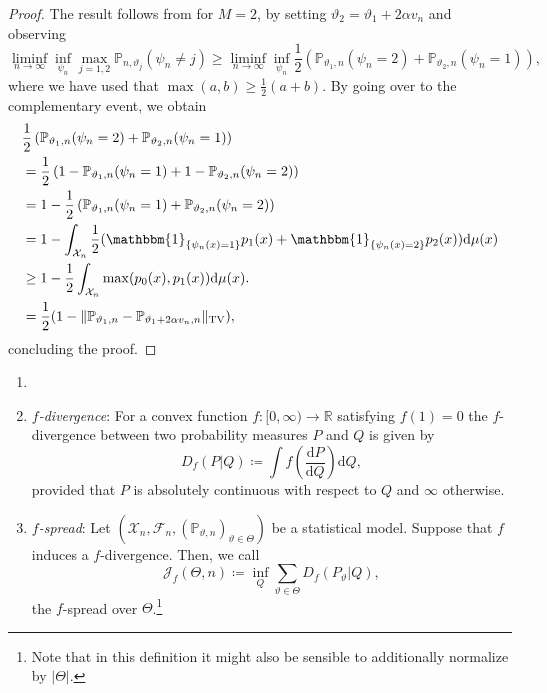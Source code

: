 \documentclass[a4paper]{article}
\begin{document}
\begin{proof}
The result follows from  for $M=2$, by setting $\vartheta_2=\vartheta_1 + 2 \alpha v_n$ and observing
\begin{equation*}
\liminf_{n\rightarrow \infty} \inf_{\psi_n} \max_{j=1,2}\mathbb{P}_{n,\vartheta_j}(\psi_n \neq j) \geq \liminf_{n\rightarrow \infty} \inf_{\psi_n} \frac{1}{2}\left(\mathbb{P}_{\vartheta_1,n}(\psi_n = 2) + \mathbb{P}_{\vartheta_2, n}(\psi_n = 1)\right),
\end{equation*}
where we have used that $\max(a,b) \geq \frac{1}{2}(a+b)$. By going over to the complementary event, we obtain
\begin{equation*}
\begin{aligned}
&\frac{1}{2}\left(\mathbb{P}_{\vartheta_1,n}(\psi_n = 2) + \mathbb{P}_{\vartheta_2, n}(\psi_n = 1)\right) \\
&=\frac{1}{2}\left( 1 - \mathbb{P}_{\vartheta_1,n}(\psi_n=1) + 1- \mathbb{P}_{\vartheta_2,n}(\psi_n=2)\right)\\
&=1 - \frac{1}{2}\left(\mathbb{P}_{\vartheta_1,n}(\psi_n=1)+ \mathbb{P}_{\vartheta_2,n}(\psi_n=2)\right)\\
&=1 - \int_{\mathcal{X}_n} \frac{1}{2}(\mathbbm{1}_{\{\psi_{n}(x)=1\}
}p_1(x) + \mathbbm{1}_{\{\psi_{n}(x)=2\}
}p_2(x) ) \mathrm{d}\mu(x)\\
&\geq 1 - \frac{1}{2}\int_{\mathcal{X}_n} \max(p_0(x), p_1(x))\mathrm{d}\mu(x). \\
&= \frac{1}{2}(1-\Vert \mathbb{P}_{\vartheta_1,n} -  \mathbb{P}_{\vartheta_1 + 2\alpha v_n, n}\Vert_{\mathrm{TV}}),
\end{aligned}
\end{equation*}
concluding the proof. 
\end{proof}
\begin{definition}
\label{definition:f_divergence}
\begin{enumerate}
\item[]
\item \textit{$f$-divergence}: For a convex function $f:[0,\infty) \rightarrow \mathbb{R}$ satisfying $f(1)=0$ the $f$-divergence between two probability measures $P$ and $Q$ is given by
\begin{equation*}
D_f(P | Q) \coloneqq \int f \left(\frac{\mathrm{d}P}{\mathrm{d}Q}\right)\mathrm{d}Q,
\end{equation*}
provided that $P$ is absolutely continuous with respect to $Q$ and $\infty$ otherwise.
\item \textit{$f$-spread}: Let $(\mathcal{X}_n, \mathcal{F}_n, (\mathbb{P}_{\vartheta,n})_{\vartheta \in \Theta})$ be a statistical model. Suppose that $f$ induces a $f$-divergence. Then, we call 
\begin{equation}
\label{eq:f_spread}
\mathcal{J}_f(\Theta, n) \coloneqq \inf_{Q} \sum_{\vartheta \in \Theta} D_{f}(P_{\vartheta}|Q),
\end{equation}
the $f$-spread over $\Theta$.\footnote{Note that in this definition it might also be sensible to additionally normalize by $|\Theta|$.}
\end{enumerate}
\end{definition}
\end{document}
